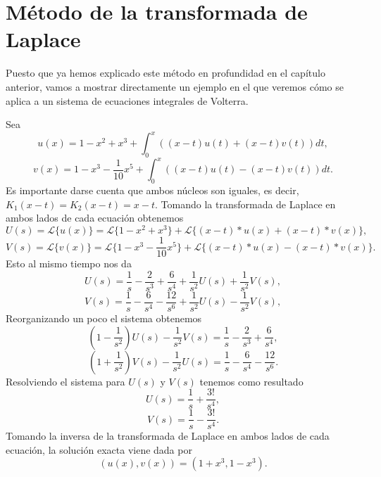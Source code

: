 \section{Método de la transformada de Laplace}
Puesto que ya hemos explicado este método en profundidad en el capítulo anterior, vamos a mostrar directamente un ejemplo en el que veremos cómo se aplica a un sistema de ecuaciones integrales de Volterra.
\begin{ejemplo}
	Sea
	\begin{equation}
		u(x) = 1 - x^2 + x^3 + \int_{0}^{x}((x-t)u(t) + (x-t)v(t))dt,
	\end{equation}
	\begin{equation}
		v(x) = 1 - x^3 - \dfrac{1}{10}x^5 + \int_{0}^{x}((x-t)u(t) - (x-t)v(t))dt.
	\end{equation}
	Es importante darse cuenta que ambos núcleos son iguales, es decir, $K_1(x-t) = K_2(x-t) = x-t$. Tomando la transformada de Laplace en ambos lados de cada ecuación obtenemos
	\begin{equation}
		U(s) = \mathcal{L}\{u(x)\} = \mathcal{L}\{1 - x^2 + x^3\} + \mathcal{L}\{(x-t)\ast u(x) + (x-t) \ast v(x)\},
	\end{equation}
	\begin{equation}
		V(s) = \mathcal{L}\{v(x)\} = \mathcal{L}\{1 - x^3 - \dfrac{1}{10}x^5\} + 	\mathcal{L}\{(x-t)\ast u(x) - (x-t) \ast v(x)\}.
	\end{equation}
	Esto al mismo tiempo nos da
	\begin{equation}
		U(s) = \dfrac{1}{s} - \dfrac{2}{s^3} + \dfrac{6}{s^4} + \dfrac{1}{s^2}U(s) + \dfrac{1}{s^2}V(s),
	\end{equation}
	\begin{equation}
		V(s) = \dfrac{1}{s} - \dfrac{6}{s^4} - \dfrac{12}{s^6} + \dfrac{1}{s^2}U(s) 	- \dfrac{1}{s^2}V(s),
	\end{equation}
	Reorganizando un poco el sistema obtenemos
	\begin{equation}
		(1-\dfrac{1}{s^2})U(s) - \dfrac{1}{s^2}V(s) = \dfrac{1}{s} - \dfrac{2}{s^3} + \dfrac{6}{s^4},
	\end{equation}
	\begin{equation}
		(1+\dfrac{1}{s^2})V(s) - \dfrac{1}{s^2}U(s) = \dfrac{1}{s} - \dfrac{6}{s^4}	- \dfrac{12}{s^6}.
	\end{equation}
	Resolviendo el sistema para $U(s)$ y $V(s)$ tenemos como resultado
	\begin{equation}
		U(s) = \dfrac{1}{s} + \dfrac{3!}{s^4},
	\end{equation}
	\begin{equation}
		V(s) = \dfrac{1}{s} - \dfrac{3!}{s^4}.
	\end{equation}
	Tomando la inversa de la transformada de Laplace en ambos lados de cada ecuación, la solución exacta viene dada por
	\begin{equation}
		(u(x),v(x)) = (1 + x^3, 1 - x^3).
	\end{equation}
\end{ejemplo}

\endinput
